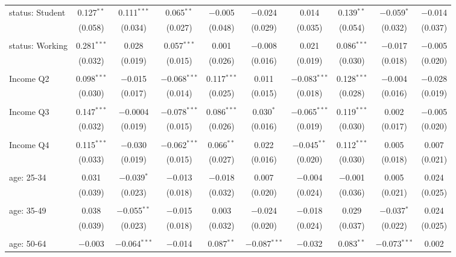 \begin{tabular}{@{\extracolsep{5pt}}lccccccccc}
 status: Student & 0.127$^{**}$ & 0.111$^{***}$ & 0.065$^{**}$ & $-$0.005 & $-$0.024 & 0.014 & 0.139$^{**}$ & $-$0.059$^{*}$ & $-$0.014 \\ 
  & (0.058) & (0.034) & (0.027) & (0.048) & (0.029) & (0.035) & (0.054) & (0.032) & (0.037) \\ 
  & & & & & & & & & \\ 
 status: Working & 0.281$^{***}$ & 0.028 & 0.057$^{***}$ & 0.001 & $-$0.008 & 0.021 & 0.086$^{***}$ & $-$0.017 & $-$0.005 \\ 
  & (0.032) & (0.019) & (0.015) & (0.026) & (0.016) & (0.019) & (0.030) & (0.018) & (0.020) \\ 
  & & & & & & & & & \\ 
 Income Q2 & 0.098$^{***}$ & $-$0.015 & $-$0.068$^{***}$ & 0.117$^{***}$ & 0.011 & $-$0.083$^{***}$ & 0.128$^{***}$ & $-$0.004 & $-$0.028 \\ 
  & (0.030) & (0.017) & (0.014) & (0.025) & (0.015) & (0.018) & (0.028) & (0.016) & (0.019) \\ 
  & & & & & & & & & \\ 
 Income Q3 & 0.147$^{***}$ & $-$0.0004 & $-$0.078$^{***}$ & 0.086$^{***}$ & 0.030$^{*}$ & $-$0.065$^{***}$ & 0.119$^{***}$ & 0.002 & $-$0.005 \\ 
  & (0.032) & (0.019) & (0.015) & (0.026) & (0.016) & (0.019) & (0.030) & (0.017) & (0.020) \\ 
  & & & & & & & & & \\ 
 Income Q4 & 0.115$^{***}$ & $-$0.030 & $-$0.062$^{***}$ & 0.066$^{**}$ & 0.022 & $-$0.045$^{**}$ & 0.112$^{***}$ & 0.005 & 0.007 \\ 
  & (0.033) & (0.019) & (0.015) & (0.027) & (0.016) & (0.020) & (0.030) & (0.018) & (0.021) \\ 
  & & & & & & & & & \\ 
 age: 25-34 & 0.031 & $-$0.039$^{*}$ & $-$0.013 & $-$0.018 & 0.007 & $-$0.004 & $-$0.001 & 0.005 & 0.024 \\ 
  & (0.039) & (0.023) & (0.018) & (0.032) & (0.020) & (0.024) & (0.036) & (0.021) & (0.025) \\ 
  & & & & & & & & & \\ 
 age: 35-49 & 0.038 & $-$0.055$^{**}$ & $-$0.015 & 0.003 & $-$0.024 & $-$0.018 & 0.029 & $-$0.037$^{*}$ & 0.024 \\ 
  & (0.039) & (0.023) & (0.018) & (0.032) & (0.020) & (0.024) & (0.037) & (0.022) & (0.025) \\ 
  & & & & & & & & & \\ 
 age: 50-64 & $-$0.003 & $-$0.064$^{***}$ & $-$0.014 & 0.087$^{**}$ & $-$0.087$^{***}$ & $-$0.032 & 0.083$^{**}$ & $-$0.073$^{***}$ & 0.002 \\ 

\end{tabular}
